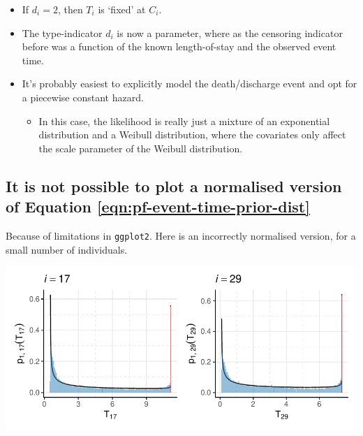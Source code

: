\documentclass[
  10pt,
  a4paper,
]{article}
\providecommand{\tightlist}{%
  \setlength{\itemsep}{0pt}\setlength{\parskip}{0pt}}
\begin{document}
\begin{itemize}
\tightlist
\item
  If \(d_{i} = 2\), then \(T_{i}\) is `fixed' at \(C_{i}\).
\item
  The type-indicator \(d_{i}\) is now a parameter, where as the
  censoring indicator before was a function of the known length-of-stay
  and the observed event time.
\item
  It's probably easiest to explicitly model the death/discharge event
  and opt for a piecewise constant hazard.

  \begin{itemize}
  \tightlist
  \item
    In this case, the likelihood is really just a mixture of an
    exponential distribution and a Weibull distribution, where the
    covariates only affect the scale parameter of the Weibull
    distribution.
  \end{itemize}
\end{itemize}

\hypertarget{it-is-not-possible-to-plot-a-normalised-version-of-equation}{%
\subsection{\texorpdfstring{It is not possible to plot a normalised
version of Equation
\eqref{eqn:pf-event-time-prior-dist}}{It is not possible to plot a normalised version of Equation }}\label{it-is-not-possible-to-plot-a-normalised-version-of-equation}}

Because of limitations in \texttt{ggplot2}. Here is an incorrectly
normalised version, for a small number of individuals.

\begin{center}\includegraphics{../plots/mimic-example/pf-prior-plot-small} \end{center}
\end{document}
